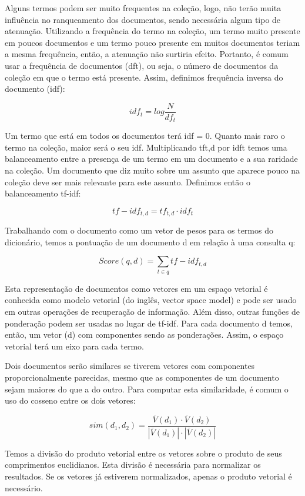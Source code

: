 Alguns termos podem ser muito frequentes na coleção, logo, não terão muita influência no ranqueamento dos documentos, sendo necessária algum tipo de atenuação. Utilizando a frequência do termo na coleção, um termo muito presente em poucos documentos e um termo pouco presente em muitos documentos teriam a mesma frequência, então, a atenuação não surtiria efeito. Portanto, é comum usar a frequência de documentos (dft), ou seja, o número de documentos da coleção em que o termo está presente. Assim, definimos frequência inversa do documento (idf):

$$idf_{t} = log \frac{N}{df_{t}}$$

Um termo que está em todos os documentos terá idf = 0. Quanto mais raro o termo na coleção, maior será o seu idf. Multiplicando tft,d por idft temos uma balanceamento entre a presença de um termo em um documento e a sua raridade na coleção. Um documento que diz muito sobre um assunto que aparece pouco na coleção deve ser mais relevante para este assunto. Definimos então o balanceamento tf-idf:

$$tf-idf_{t,d} = tf_{t,d} \cdot idf_{t}$$

Trabalhando com o documento como um vetor de pesos para os termos do dicionário, temos a pontuação de um documento d em relação à uma consulta q:

\begin{displaymath}
Score(q,d) = \sum_{t \in q} tf-idf_{t,d}
\end{displaymath}

Esta representação de documentos como vetores em um espaço vetorial é conhecida como modelo vetorial (do inglês, vector space model) e pode ser usado em outras operações de recuperação de informação. Além disso, outras funções de ponderação podem ser usadas no lugar de tf-idf. Para cada documento d temos, então, um vetor (d) com componentes sendo as ponderações. Assim, o espaço vetorial terá um eixo para cada termo.

Dois documentos serão similares se tiverem vetores com componentes proporcionalmente parecidas, mesmo que as componentes de um documento sejam maiores do que a do outro. Para computar esta similaridade, é comum o uso do cosseno entre os dois vetores:

$$sim(d_{1},d_{2}) = \frac{\overline{V}(d_{1})\cdot \overline{V}(d_{2})}{|\overline{V}(d_{1})|\cdot|\overline{V}(d_{2})|}$$

Temos a divisão do produto vetorial entre os vetores sobre o produto de seus comprimentos euclidianos. Esta divisão é necessária para normalizar os resultados. Se os vetores já estiverem normalizados, apenas o produto vetorial é necessário.

